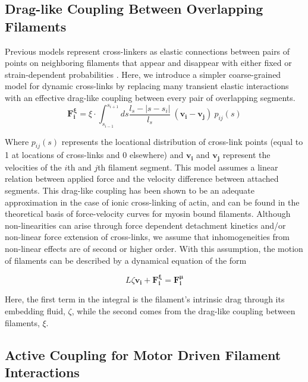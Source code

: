\documentclass[10pt,letterpaper]{article}
\begin{document}
\subsection*{Drag-like Coupling Between Overlapping Filaments}
\label{exp_drag}
Previous models represent cross-linkers as elastic connections between pairs of points on neighboring filaments that appear and disappear with either fixed or strain-dependent probabilities \cite{model_taeyoontheo_crosslinknonlinear}.  Here, we introduce a simpler coarse-grained model for dynamic cross-links by replacing many transient elastic interactions with an effective drag-like coupling between every pair of overlapping segments.
\begin{equation}
\label{eqn:drag}
\mathbf{F^{\xi}_i} = \xi \cdot \int^{s_{i+1}}_{s_{i-1}} ds \frac{l_s-|s-s_i|}{l_s} \: (\mathbf{v_i}-\mathbf{v_j}) \: p_{ij}(s)
\end{equation}

Where $p_{ij}(s)$ represents the locational distribution of cross-link points (equal to 1 at locations of cross-links and 0 elsewhere) and $\mathbf{v_i}$ and $\mathbf{v_j}$ represent the velocities of the $i$th and $j$th filament segment.  This model assumes a linear relation between applied force and the velocity difference between attached segments.  This drag-like coupling has been shown to be an adequate approximation in the case of ionic cross-linking of actin\cite{mol_fric,theo_hydroish2}, and can be found in the theoretical basis of force-velocity curves for myosin bound filaments\cite{theo_frictionShila}. Although non-linearities can arise through force dependent detachment kinetics and/or non-linear force extension of cross-links, we assume that inhomogeneities from non-linear effects are of second or higher order. With this assumption, the motion of filaments can be described by a dynamical equation of the form

\begin{equation}
\label{eqn:syst1}
L\zeta\mathbf{ v_i} +\mathbf{F^{\xi}_i}= \mathbf{F^{\mu}_i}
\end{equation}

Here, the first term in the integral is the filament's intrinsic drag through its embedding fluid, $\zeta$, while the second comes from the drag-like coupling between filaments, $\xi$.  

\subsection*{Active Coupling for Motor Driven Filament Interactions}
\end{document}
